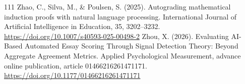 \begin{thebibliography}{111}
 Zhao, C., Silva, M., \& Poulsen, S. (2025). Autograding mathematical induction proofs with natural language processing. International Journal of Artificial Intelligence in Education, 35, 3202--3232. \url{https://doi.org/10.1007/s40593-025-00498-2}
 Zhou, X. (2026). Evaluating AI-Based Automated Essay Scoring Through Signal Detection Theory: Beyond Aggregate Agreement Metrics. Applied Psychological Measurement, advance online publication, article 01466216261471171. \url{https://doi.org/10.1177/01466216261471171}
\end{thebibliography}
